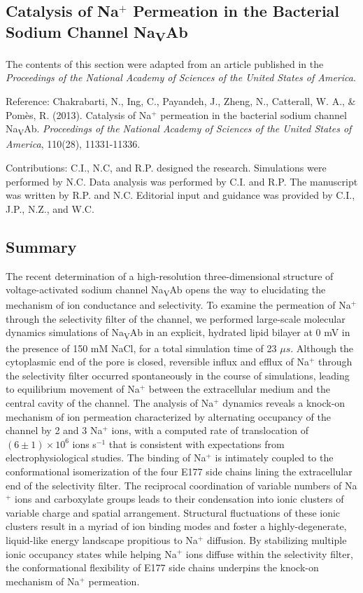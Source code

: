  \begin{refsection}
\chapter{Catalysis of Na$^+$ Permeation in the Bacterial Sodium Channel Na\textsubscript{V}Ab}

The contents of this section were adapted from an article published in the \textit{Proceedings of the National Academy of Sciences of the United States of America}.\par
\bigskip
Reference: Chakrabarti, N., Ing, C., Payandeh, J., Zheng, N., Catterall, W. A., \& Pom\`es, R. (2013). Catalysis of Na$^+$ permeation in the bacterial sodium channel Na\textsubscript{V}Ab. \textit{Proceedings of the National Academy of Sciences of the United States of America}, 110(28), 11331-11336.\par
\bigskip
Contributions: C.I., N.C, and R.P. designed the research. Simulations were performed by N.C. Data analysis was performed by C.I. and R.P. The manuscript was written by R.P. and N.C. Editorial input and guidance was provided by C.I., J.P., N.Z., and W.C.

\newpage

\section{Summary}

The recent determination of a high-resolution three-dimensional structure of voltage-activated sodium channel Na\textsubscript{V}Ab opens the way to elucidating the mechanism of ion conductance and selectivity.  To examine the permeation of Na$^+$ through the selectivity filter of the channel, we performed large-scale molecular dynamics simulations of Na\textsubscript{V}Ab in an explicit, hydrated lipid bilayer at 0 mV in the presence of 150 mM NaCl, for a total simulation time of 23 $\mu s$.  Although the cytoplasmic end of the pore is closed, reversible influx and efflux of Na$^+$ through the selectivity filter occurred spontaneously in the course of simulations, leading to equilibrium movement of Na$^+$ between the extracellular medium and the central cavity of the channel.  The analysis of Na$^+$ dynamics reveals a knock-on mechanism of ion permeation characterized by alternating occupancy of the channel by 2 and 3 Na$^+$ ions, with a computed rate of translocation of $(6 \pm 1)\times10^{6}$ ions s$^{-1}$ that is consistent with expectations from electrophysiological studies.  The binding of Na$^+$ is intimately coupled to the conformational isomerization of the four E177 side chains lining the extracellular end of the selectivity filter.  The reciprocal coordination of variable numbers of Na$^+$ ions and carboxylate groups leads to their condensation into ionic clusters of variable charge and spatial arrangement.  Structural fluctuations of these ionic clusters result in a myriad of ion binding modes and foster a highly-degenerate, liquid-like energy landscape propitious to Na$^+$ diffusion.  By stabilizing multiple ionic occupancy states while helping Na$^+$ ions diffuse within the selectivity filter, the conformational flexibility of E177 side chains underpins the knock-on mechanism of Na$^+$ permeation.


\end{refsection}
